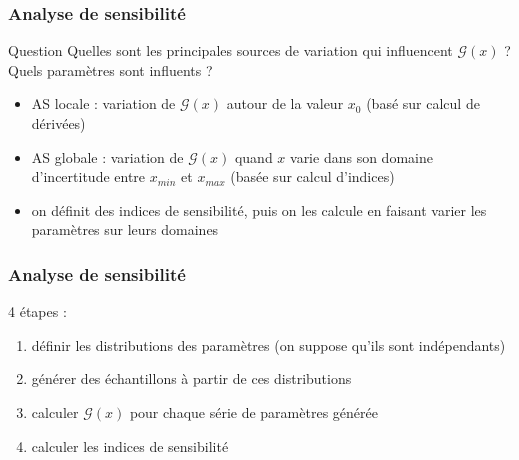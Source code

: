 \documentclass[10pt]{beamer}
\begin{document}
\begin{frame}

\frametitle{Analyse de sensibilité}
\bigskip
\bigskip

\begin{block}{Question}
	Quelles sont les principales sources de variation qui influencent $ \mathcal{G} (x) $ ?
	Quels paramètres sont influents ?
\end{block}

\begin{itemize}
	\item AS locale : variation de $ \mathcal{G} (x) $ autour de la valeur $ x_{0} $ (basé sur calcul de dérivées)
	\item AS globale : variation de $ \mathcal{G} (x) $ quand $ x $ varie dans son domaine d'incertitude entre $ x_{min} $ et $ x_{max} $ (basée sur calcul d'indices)
	\item on définit des indices de sensibilité, puis on les calcule en faisant varier les paramètres sur leurs domaines
\end{itemize}

\end{frame}

\begin{frame}
\frametitle{Analyse de sensibilité}

\bigskip
\bigskip

4 étapes :	
\begin{enumerate}
	\item définir les distributions des paramètres (on suppose qu'ils sont indépendants)
	\item générer des échantillons à partir de ces distributions
	\item calculer $ \mathcal{G} (x) $ pour chaque série de paramètres générée
	\item calculer les indices de sensibilité
\end{enumerate}

\end{frame}
\end{document}
